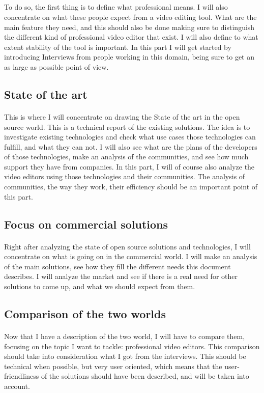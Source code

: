 \subparagraph{}
    To do so, the first thing is to define what professional means. I
    will also concentrate on what these people expect from a video
    editing tool.  What are the main feature they need, and this
    should also be done making sure to distinguish the different kind
    of professional video editor that exist. I will also define to what
    extent stability of the tool is important. In this part I will get
    started by introducing Interviews from people working in this domain,
    being sure to get an as large as possible point of view.

\subsection*{State of the art} \paragraph{}
    This is where I will concentrate on drawing the State of the art in
    the open source world. This is a  technical report of the existing
    solutions.  The idea is to investigate existing technologies and
    check what use cases those technologies can fulfill, and what they
    can not. I will also see what are the plans of the developers of
    those technologies, make an analysis of the communities, and see
    how much support they have from companies. In this part, I will of
    course also analyze the video editors using those technologies and
    their communities. The analysis of communities, the way they work,
    their efficiency should be an important point of this part.

\subsection*{Focus on commercial solutions} \paragraph{}
    Right after analyzing the state of open source solutions and
    technologies, I will concentrate on what is going on in the commercial
    world. I will make an analysis of the main solutions, see how they
    fill the different needs this document describes. I will analyze
    the market and see if there is a real need for other solutions to
    come up, and what we should expect from them.

\subsection*{Comparison of the two worlds} \paragraph {}
    Now that I have a description of the two world, I will have to
    compare them, focusing on the topic I want to tackle: professional
    video editors. This comparison should take into consideration what
    I got from the interviews. This should be technical when possible,
    but very user oriented, which means that the user-friendliness of the
    solutions should have been described, and will be taken into account.


